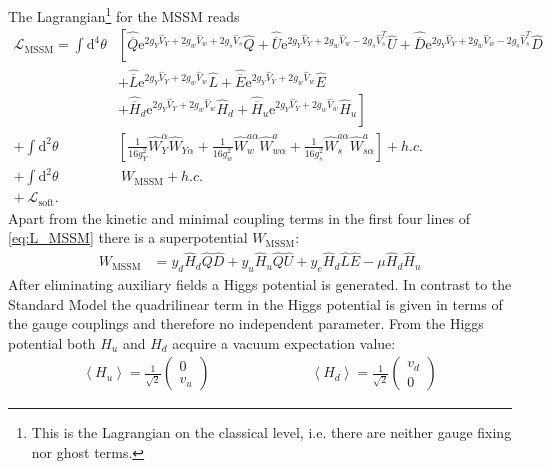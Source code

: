 The Lagrangian\footnote{This is the Lagrangian on the classical level, i.e. there are neither gauge fixing nor ghost terms.} for the MSSM reads
\begin{align}
\mathcal{L}_{\mathrm{MSSM}} = \int \mathrm{d}^4 \theta & \left[ \hat{\overline{Q}}\mathrm{e}^{2g_Y \hat{V}_Y + 2g_w\hat{V}_w + 2g_s\hat{V}_s}\hat{Q} + \hat{\overline{U}}\mathrm{e}^{2g_Y \hat{V}_Y + 2g_w\hat{V}_w - 2g_s\hat{V}^T_s}\hat{U} + \hat{\overline{D}}\mathrm{e}^{2g_Y \hat{V}_Y + 2g_w\hat{V}_w - 2g_s\hat{V}^T_s}\hat{D} \right.\nonumber\\
 & + \hat{\overline{L}}\mathrm{e}^{2g_Y \hat{V}_Y + 2g_w\hat{V}_w}\hat{L} + \hat{\overline{E}}\mathrm{e}^{2g_Y \hat{V}_Y + 2g_w\hat{V}_w}\hat{E}\nonumber\\
 & + \left. \hat{\overline{H}}_d\mathrm{e}^{2g_Y \hat{V}_Y + 2g_w\hat{V}_w}\hat{H}_d + \hat{\overline{H}}_u\mathrm{e}^{2g_Y \hat{V}_Y + 2g_w\hat{V}_w}\hat{H}_u \right]\nonumber\\
 + \int \mathrm{d}^2\theta & \left[ \frac{1}{16g_Y^2} \hat{W}_Y^{\alpha}\hat{W}_{Y\alpha} + \frac{1}{16g_w^{2}} \hat{W}_w^{a\alpha}\hat{W}^a_{w\alpha} + \frac{1}{16g_s^2} \hat{W}_s^{a\alpha}\hat{W}^a_{s\alpha} \right] + h.c.\nonumber\\
 + \int \mathrm{d}^2\theta&\ W_{\mathrm{MSSM}} + h.c.\nonumber\\
 +\  \mathcal{L}_{\mathrm{soft}}.\ &\label{eq:L_MSSM}
\end{align}
Apart from the kinetic and minimal coupling terms in the first four lines of \ref{eq:L_MSSM} there is a superpotential $W_{\mathrm{MSSM}}$:
\begin{align}
W_\mathrm{{MSSM}} &= y_d \hat{H}_d \hat{Q} \hat{D} + y_u \hat{H}_u \hat{Q} \hat U + y_e \hat{H}_d \hat{L} \hat{E} - \mu \hat{H}_d \hat{H}_u\label{eq:W_MSSM}
\end{align}
After eliminating auxiliary fields a Higgs potential is generated. In contrast to the Standard Model the quadrilinear term in the Higgs potential is given in terms of the gauge couplings and therefore no independent parameter. From the Higgs potential both $H_u$ and $H_d$ acquire a vacuum expectation value:
\begin{align}
\left\langle H_u \right\rangle = \frac{1}{\sqrt{2}}\begin{pmatrix}
0 \\ v_u
\end{pmatrix} \hspace{3cm} 
\left\langle H_d \right\rangle = \frac{1}{\sqrt{2}}\begin{pmatrix}
v_d \\ 0
\end{pmatrix}
\end{align}
